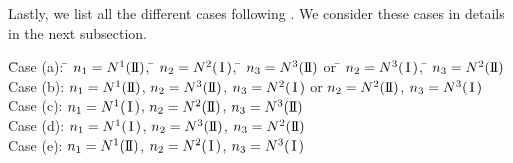 \documentclass[11pt]{amsart}
\numberwithin{equation}{section} \numberwithin{theorem}{section}
\begin{document}
Lastly, we list all the different cases following \cite{Bourgain:1996p446}. We consider these cases in details in the next subsection.
\begin{tabbing}
	\hspace{1cm} \=Case (a): \= $n_1 = N^1({\text{I \hspace{-2.8mm} I} })$, \= $n_2 = N^2({\hspace{0.5mm}\text{I}\hspace{0.5mm}})$, \= $n_3 = N^3({\text{I \hspace{-2.8mm} I} })$ or \= $n_2 = N^3({\hspace{0.5mm}\text{I}\hspace{0.5mm}})$, \= $n_3 = N^2({\text{I \hspace{-2.8mm} I} })$ \\
	
	\>Case (b): \>$n_1 = N^1({\text{I \hspace{-2.8mm} I} })$, \>$n_2 = N^3({\text{I \hspace{-2.8mm} I} })$, \> $n_3 = N^2({\hspace{0.5mm}\text{I}\hspace{0.5mm}})$ or \>$n_2 = N^2({\text{I \hspace{-2.8mm} I} })$, \> $n_3 = N^3({\hspace{0.5mm}\text{I}\hspace{0.5mm}})$ \\
	
	\>Case (c): \> $n_1 = N^1({\hspace{0.5mm}\text{I}\hspace{0.5mm}})$, \>$n_2 = N^2({\text{I \hspace{-2.8mm} I} })$, \>$n_3 = N^3({\text{I \hspace{-2.8mm} I} })$ \\
	
	\>Case (d): \>$n_1 = N^1({\hspace{0.5mm}\text{I}\hspace{0.5mm}})$, \>$n_2 = N^3({\text{I \hspace{-2.8mm} I} })$, \>$n_3 = N^2({\text{I \hspace{-2.8mm} I} })$\\
	
	\>Case (e): \>$n_1 = N^1({\text{I \hspace{-2.8mm} I} })$, \>$n_2 = N^2({\hspace{0.5mm}\text{I}\hspace{0.5mm}})$, \>$n_3 = N^3({\hspace{0.5mm}\text{I}\hspace{0.5mm}})$\\
	

\end{tabbing}
\end{document}

